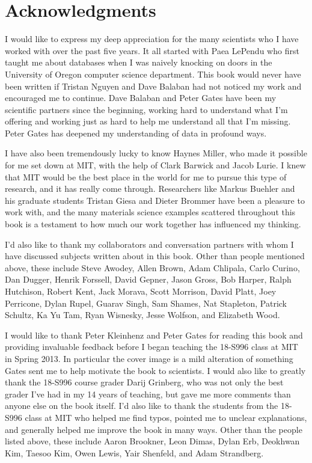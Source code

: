 \documentclass{book}
\theoremstyle{remark}
\theoremstyle{definition}
\begin{document}

\section{Acknowledgments}

I would like to express my deep appreciation for the many scientists who I have worked with over the past five years. It all started with Paea LePendu who first taught me about databases when I was naively knocking on doors in the University of Oregon computer science department. This book would never have been written if Tristan Nguyen and Dave Balaban had not noticed my work and encouraged me to continue. Dave Balaban and Peter Gates have been my scientific partners since the beginning, working hard to understand what I'm offering and working just as hard to help me understand all that I'm missing. Peter Gates has deepened my understanding of data in profound ways. 

I have also been tremendously lucky to know Haynes Miller, who made it possible for me set down at MIT, with the help of Clark Barwick and Jacob Lurie. I knew that MIT would be the best place in the world for me to pursue this type of research, and it has really come through. Researchers like Markus Buehler and his graduate students Tristan Giesa and Dieter Brommer have been a pleasure to work with, and the many materials science examples scattered throughout this book is a testament to how much our work together has influenced my thinking. 

I'd also like to thank my collaborators and conversation partners with whom I have discussed subjects written about in this book. Other than people mentioned above, these include Steve Awodey, Allen Brown, Adam Chlipala, Carlo Curino, Dan Dugger, Henrik Forssell, David Gepner, Jason Gross, Bob Harper, Ralph Hutchison, Robert Kent, Jack Morava, Scott Morrison, David Platt, Joey Perricone, Dylan Rupel, Guarav Singh, Sam Shames, Nat Stapleton, Patrick Schultz, Ka Yu Tam, Ryan Wisnesky, Jesse Wolfson, and Elizabeth Wood.

I would like to thank Peter Kleinhenz and Peter Gates for reading this book and providing invaluable feedback before I began teaching the 18-S996 class at MIT in Spring 2013. In particular the cover image is a mild alteration of something Gates sent me to help motivate the book to scientists. I would also like to greatly thank the 18-S996 course grader Darij Grinberg, who was not only the best grader I've had in my 14 years of teaching, but gave me more comments than anyone else on the book itself. I'd also like to thank the students from the 18-S996 class at MIT who helped me find typos, pointed me to unclear explanations, and generally helped me improve the book in many ways. Other than the people listed above, these include Aaron Brookner, Leon Dimas, Dylan Erb, Deokhwan Kim, Taesoo Kim, Owen Lewis, Yair Shenfeld, and Adam Strandberg.
\end{document}
